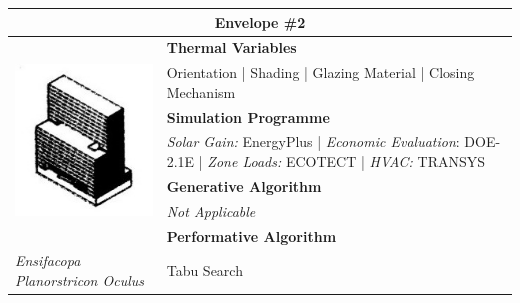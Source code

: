 \clearpage

\begin{table}
	\begin{tabular}{ | m{6cm} | m{14cm} |}
	\toprule
	\multicolumn{2}{c}{Envelope \#{}2} \\[1cm] \hline
	\multirow{7}{*}{\includegraphics[width=5.5cm]{./Images/11-Envelope2}} & \textbf{Thermal Variables} \\[1cm]
	& Orientation | Shading | Glazing Material | Closing Mechanism\vspace{0.5cm}\\ \cline{2-2}
		 & \textbf{Simulation Programme} \\[1cm]
		 & \emph{Solar Gain:} EnergyPlus | \emph{Economic Evaluation}: DOE-2.1E | \emph{Zone Loads:} ECOTECT | \emph{HVAC:} TRANSYS \vspace{0.5cm}\\ \cline{2-2}
		 & \textbf{Generative Algorithm} \\[1cm]
		 & \emph{Not Applicable}\vspace{0.5cm}\\ \cline{2-2}
		 & \textbf{Performative Algorithm} \\[1cm]
		 \emph{Ensifacopa Planorstricon Oculus} &  Tabu Search\vspace{0.5cm}\\
	\bottomrule
	\end{tabular}
\end{table}

